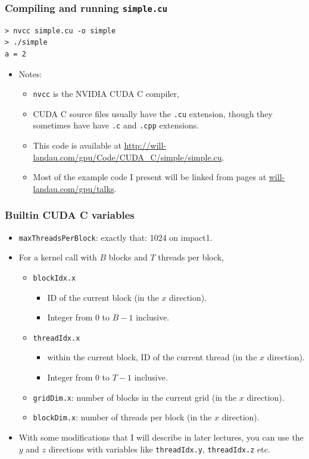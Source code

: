\documentclass[handout]{beamer}
\numberwithin{equation}{section}
\begin{document}
\begin{frame}[fragile]
\frametitle{Compiling and running {\tt simple.cu}}
\begin{lstlisting}
> nvcc simple.cu -o simple
> ./simple
a = 2
\end{lstlisting}
\begin{itemize}
\pause \item Notes:
\begin{itemize}
\item {\tt nvcc} is the NVIDIA CUDA C compiler, 
\pause \item CUDA C source files usually have the {\tt *.cu} extension, though they sometimes have have {\tt *.c} and {\tt *.cpp} extensions.
\pause \item This code is available at \url{http://will-landau.com/gpu/Code/CUDA_C/simple/simple.cu}. 
\pause \item Most of the example code I present will be linked from pages at \url{will-landau.com/gpu/talks}.
\end{itemize}
\end{itemize}
\end{frame}



\begin{frame}
\frametitle{Builtin CUDA C variables}
\begin{itemize}
\pause \item {\tt maxThreadsPerBlock}: exactly that: 1024 on impact1.
\pause \item For a kernel call with $B$ blocks and $T$ threads per block,
\begin{itemize}
\pause \item {\tt blockIdx.x}
\begin{itemize}
\pause \item ID of the current block (in the $x$ direction).
\pause \item Integer from 0 to $B - 1$ inclusive.
\end{itemize}
\pause \item {\tt threadIdx.x}
\begin{itemize}
\pause \item within the current block, ID of the current thread (in the $x$ direction).
\pause \item Integer from 0 to $T - 1$ inclusive.
\end{itemize}
\pause \item {\tt gridDim.x}: number of blocks in the current grid (in the $x$ direction).
\pause \item {\tt blockDim.x}: number of threads per block (in the $x$ direction).
\end{itemize}
\pause \item With some modifications that I will describe in later lectures, you can use the $y$ and $z$ directions with variables like {\tt threadIdx.y}, {\tt threadIdx.z} etc.
\end{itemize}
\end{frame}
\end{document}
